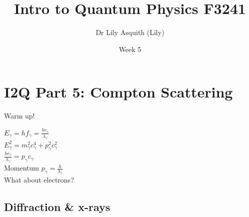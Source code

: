 


% 
\title[ Intro to Quantum Physics]{Intro to Quantum Physics F3241}
\author[Dr Lily Asquith (Lily)]{ Dr Lily Asquith (Lily)}
\date[Week 5]{ Week 5}





\begin{frame}
\titlepage
\end{frame} 


\section{I2Q Part 5: Compton Scattering}

 
 \begin{frame}{Warm up!}
\small

$E_{\gamma} = hf_{\gamma} = \frac{hc_{\gamma} }{\lambda_{\gamma} }$\\

$E^2_{\gamma} = m_{\gamma} ^2 c_{\gamma} ^{4} +p_{\gamma} ^2c_{\gamma} ^2 $\\

$\frac{ h c_{\gamma} }{ \lambda_{\gamma} } = p_{\gamma} c_{\gamma} $\\

Momentum $p_{\gamma} = \frac{ h}{ \lambda_{\gamma} } $ \\

What about electrons?\\
\end{frame}



\subsection{Diffraction \& x-rays}


